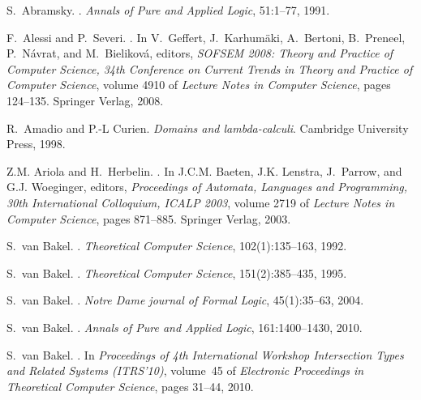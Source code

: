 \documentclass{lmcs}
\begin{document}
 \begin{thebibliography}{10}

S.~Abramsky.
.
\newblock \emph{Annals of Pure and Applied Logic}, 51:1--77, 1991.

F.~Alessi and P.~Severi.
.
\newblock In V.~Geffert, J.~Karhum{\"a}ki, A.~Bertoni, B.~Preneel,
 P.~N{\'a}vrat, and M.~Bielikov{\'a}, editors, \emph{SOFSEM 2008: Theory and
 Practice of Computer Science, 34th Conference on Current Trends in Theory and
 Practice of Computer Science}, volume 4910 of \emph{Lecture Notes in Computer
 Science}, pages 124--135. Springer Verlag, 2008.

R.~Amadio and P.-L Curien.
\newblock \emph{{Domains and lambda-calculi}}.
\newblock Cambridge University Press, 1998.

Z.M. Ariola and H.~Herbelin.
.
\newblock In J.C.M. Baeten, J.K. Lenstra, J.~Parrow, and G.J. Woeginger,
 editors, \emph{Proceedings of Automata, Languages and Programming, 30th
 International Colloquium, ICALP 2003}, volume 2719 of \emph{Lecture Notes in
 Computer Science}, pages 871--885. Springer Verlag, 2003.

S.~van Bakel.
.
\newblock \emph{Theoretical Computer Science}, 102(1):135--163, 1992.

S.~van Bakel.
.
\newblock \emph{Theoretical Computer Science}, 151(2):385--435, 1995.

S.~van Bakel.
.
\newblock \emph{Notre Dame journal of Formal Logic}, 45(1):35--63, 2004.

S.~van Bakel.
.
\newblock \emph{Annals of Pure and Applied Logic}, 161:1400--1430, 2010.

S.~van Bakel.
.
\newblock In \emph{Proceedings of 4th International Workshop \emph{Intersection
 Types and Related Systems} (ITRS'10)}, volume~45 of \emph{Electronic
 Proceedings in Theoretical Computer Science}, pages 31--44, 2010.


\end{thebibliography}
\end{document}
